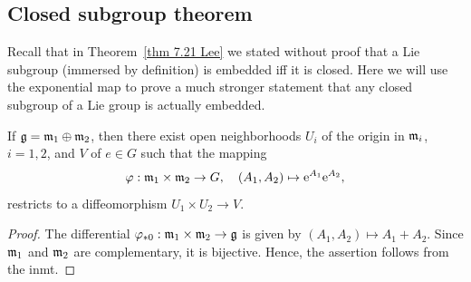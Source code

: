 \subsection{Closed subgroup theorem}


Recall that in Theorem~\ref{thm 7.21 Lee} we stated without proof that a Lie subgroup (immersed by definition) is embedded iff it is closed. Here we will use the exponential map to prove a much stronger statement that any closed subgroup of a Lie group is actually embedded.


\begin{lem}[{{\cite[Lem.~5.6.7]{RS1}}}]\label{lem 5.6.7 RS1}
    If $\mathfrak{g}=\mathfrak{m}_1\oplus\mathfrak{m}_2$, then there exist open neighborhoods $U_i$ of the origin in $\mathfrak{m}_i$, $i=1,2$, and $V$ of $e\in G$ such that the mapping
    \[\varphi:\mathfrak{m}_1\times\mathfrak{m}_2\to G,\quad (A_1,A_2)\mapsto \mathrm{e}^{A_1}\mathrm{e}^{A_2},\]
    restricts to a diffeomorphism $U_1\times U_2\to V$.
\end{lem}
\begin{proof}
    The differential $\varphi_{\ast 0}:\mathfrak{m}_1\times\mathfrak{m}_2\to\mathfrak{g}$ is given by $(A_1,A_2)\mapsto A_1+A_2$. Since $\mathfrak{m}_1$ and $\mathfrak{m}_2$ are complementary, it is bijective. Hence, the assertion follows from the \gls{inmt}.
\end{proof}



